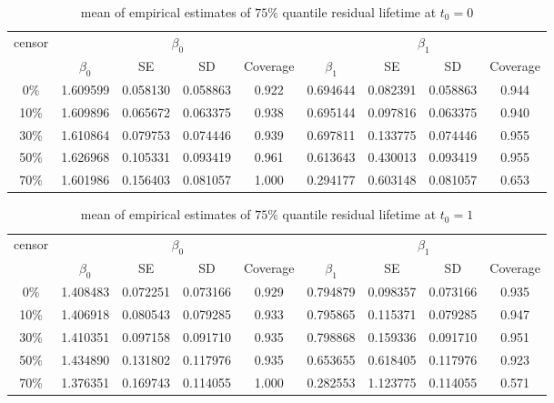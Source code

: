 \documentclass[12pt]{article}
\begin{document}
	\begin{table}[hbt!]
		\caption{mean of empirical estimates of $75\%$ quantile residual lifetime at $t_0=0$}
		\centering
		\begin{tabular}{|c|c|c|c|c|c|c|c|c|}
			\hline
			\multirow{2}{*}{censor} & \multicolumn{4}{c|}{$\beta_0$} & \multicolumn{4}{c|}{$\beta_1$}\\ \cline{2-9}
			& $\beta_0$ & SE & SD  & Coverage  & $\beta_1$ & SE & SD & Coverage\\
			\hline\hline
			0\% & 1.609599 & 0.058130 & 0.058863 & 0.922 & 0.694644 & 0.082391 & 0.058863 & 0.944 \\
			10\% & 1.609896 & 0.065672 & 0.063375 & 0.938 & 0.695144 & 0.097816 & 0.063375 & 0.940 \\
			30\% & 1.610864 & 0.079753 & 0.074446 & 0.939 & 0.697811 & 0.133775 & 0.074446 & 0.955 \\
			50\% & 1.626968 & 0.105331 & 0.093419 & 0.961 & 0.613643 & 0.430013 & 0.093419 & 0.955 \\
			70\% & 1.601986 & 0.156403 & 0.081057 & 1.000 & 0.294177 & 0.603148 & 0.081057 & 0.653 \\  
			\hline
		\end{tabular}
	\end{table}
	\begin{table}[hbt!]
		\caption{mean of empirical estimates of $75\%$ quantile residual lifetime at $t_0=1$}
		\centering
		\begin{tabular}{|c|c|c|c|c|c|c|c|c|}
			\hline
			\multirow{2}{*}{censor} & \multicolumn{4}{c|}{$\beta_0$} & \multicolumn{4}{c|}{$\beta_1$}\\ \cline{2-9}
			& $\beta_0$ & SE & SD  & Coverage  & $\beta_1$ & SE & SD & Coverage\\
			\hline\hline
			0\% & 1.408483 & 0.072251 & 0.073166 & 0.929 & 0.794879 & 0.098357 & 0.073166 & 0.935 \\
			10\% & 1.406918 & 0.080543 & 0.079285 & 0.933 & 0.795865 & 0.115371 & 0.079285 & 0.947 \\
			30\% & 1.410351 & 0.097158 & 0.091710 & 0.935 & 0.798868 & 0.159336 & 0.091710 & 0.951 \\
			50\% & 1.434890 & 0.131802 & 0.117976 & 0.935 & 0.653655 & 0.618405 & 0.117976 & 0.923 \\
			70\% & 1.376351 & 0.169743 & 0.114055 & 1.000 & 0.282553 & 1.123775 & 0.114055 & 0.571 \\ 
			\hline
		\end{tabular}
	\end{table}
\end{document}
